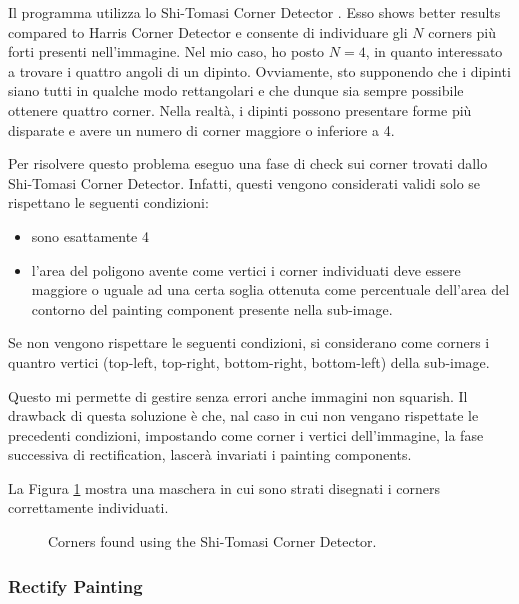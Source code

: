 \documentclass[10pt,twocolumn,letterpaper]{article}
\begin{document}
Il programma utilizza lo Shi-Tomasi Corner Detector \cite{shi1994good}. Esso shows better results compared to Harris Corner Detector \cite{harris1988combined} e consente di individuare gli $N$ corners più forti presenti nell'immagine. Nel mio caso, ho posto $N=4$, in quanto interessato a trovare i quattro angoli di un dipinto. Ovviamente, sto supponendo che i dipinti siano tutti in qualche modo rettangolari e che dunque sia sempre possibile ottenere quattro corner. Nella realtà, i dipinti possono presentare forme più disparate e avere un numero di corner maggiore o inferiore a 4. 

Per risolvere questo problema eseguo una fase di check sui corner trovati dallo Shi-Tomasi Corner Detector. Infatti, questi vengono considerati validi solo se rispettano le seguenti condizioni:
\begin{itemize}
   \item sono esattamente 4
   \item l'area del poligono avente come vertici i corner individuati deve essere maggiore o uguale ad una certa soglia ottenuta come percentuale dell'area del contorno del painting component presente nella sub-image.
\end{itemize}

Se non vengono rispettare le seguenti condizioni, si considerano come corners i quantro vertici (top-left, top-right, bottom-right, bottom-left) della sub-image. 

Questo mi permette di gestire senza errori anche immagini non squarish. Il drawback di questa soluzione è che, nal caso in cui non vengano rispettate le precedenti condizioni, impostando come corner i vertici dell'immagine, la fase successiva di rectification, lascerà invariati i painting components.

La Figura \ref{fig:cornersDetect} mostra una maschera in cui sono strati disegnati i corners correttamente individuati.

\begin{figure}[t]
   \begin{center}
   \fbox{\rule{0pt}{2in} \rule{0.9\linewidth}{0pt}}
   \end{center}
      \caption{Corners found using the Shi-Tomasi Corner Detector.}
   \label{fig:cornersDetect}
\end{figure}

\subsubsection{Rectify Painting}
\end{document}
